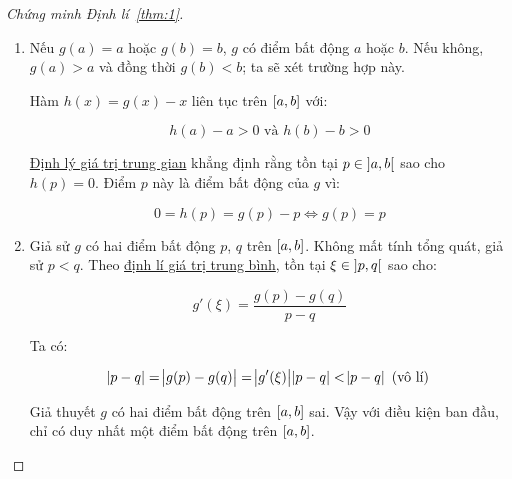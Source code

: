 \documentclass[../../Lectures.tex]{subfiles}
\begin{document}
\begin{proof}[Chứng minh Định lí~\ref{thm:1}]
\phantom\\
\begin{enumerate}
    \item Nếu \(g(a) = a\) hoặc \(g(b) = b\), \(g\) có điểm bất động \(a\) hoặc
        \(b\). Nếu không, \(g(a) > a\) và đồng thời \(g(b) < b\); ta sẽ xét
        trường hợp này.

        Hàm \(h(x) = g(x) - x\) liên tục trên \(\interval{a}{b}\) với:

        \[h(a) - a > 0 \text{ và } h(b) - b > 0\]

        \hyperref[thm:intermediate_value_theorem]{Định lý giá trị trung gian}
        khẳng định rằng tồn tại \(p \in \interval[open]{a}{b}\) sao cho \(h(p) =
        0\). Điểm \(p\) này là điểm bất động của \(g\) vì:

        \[0 = h(p) = g(p) - p \iff g(p) = p\]

    \item Giả sử \(g\) có hai điểm bất động \(p\), \(q\) trên
        \(\interval{a}{b}\). Không mất tính tổng quát, giả sử \(p < q\). Theo
        \hyperref[thm:mean_value_theorem]{định lí giá trị trung bình}, tồn tại
        \(\xi \in \interval[open]{p}{q}\) sao cho:

        \[g'(\xi) = \frac{g(p) - g(q)}{p - q}\]

        Ta có:

        \[\abs{p - q} = \abs{g(p) - g(q)} = \abs{g'(\xi)} \abs{p - q} < \abs{p - q} \text{ (vô lí)}\]

        Giả thuyết \(g\) có hai điểm bất động trên \(\interval{a}{b}\) sai. Vậy
        với điều kiện ban đầu, chỉ có duy nhất một điểm bất động trên
        \(\interval{a}{b}\).
\end{enumerate}
\end{proof}
\end{document}
